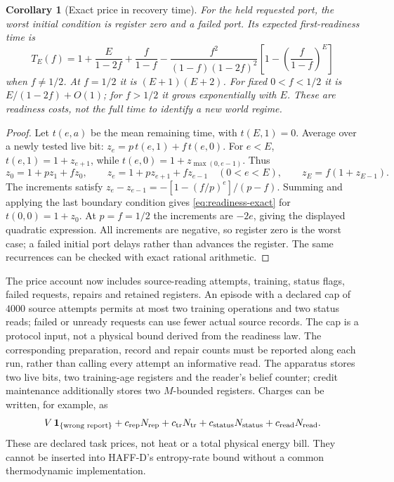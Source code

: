 \documentclass[11pt,a4paper]{article}
\newtheorem{corollary}[proposition]{Corollary}
\begin{document}
\begin{corollary}[Exact price in recovery time]\label{cor:readiness-exact}
For the held requested port, the worst initial condition is register
zero and a failed port. Its expected first-readiness time is
\begin{equation}\label{eq:readiness-exact}
 T_E(f)=1+\frac{E}{1-2f}+\frac{f}{1-f}
 -\frac{f^2}{(1-f)(1-2f)^2}
       \left[1-\left(\frac{f}{1-f}\right)^E\right]
\end{equation}
when $f\ne1/2$. At $f=1/2$ it is $(E+1)(E+2)$.
For fixed $0<f<1/2$ it is $E/(1-2f)+O(1)$; for $f>1/2$ it grows
exponentially with $E$. These are readiness costs, not the full time
to identify a new world regime.
\end{corollary}
\begin{proof}
Let $t(e,a)$ be the mean remaining time, with $t(E,1)=0$.
Average over a newly tested live bit: $z_e=p\,t(e,1)+f\,t(e,0)$.
For $e<E$, $t(e,1)=1+z_{e+1}$, while
$t(e,0)=1+z_{\max(0,e-1)}$. Thus
\[
 z_0=1+pz_1+fz_0,\qquad
 z_e=1+pz_{e+1}+fz_{e-1}\quad(0<e<E),\qquad
 z_E=f(1+z_{E-1}).
\]
The increments satisfy
$z_e-z_{e-1}=-[1-(f/p)^e]/(p-f)$.
Summing and applying the last boundary condition gives
\eqref{eq:readiness-exact} for $t(0,0)=1+z_0$.
At $p=f=1/2$ the increments are $-2e$, giving the displayed
quadratic expression. All increments are negative, so register zero
is the worst case; a failed initial port delays rather than advances
the register. The same recurrences can be checked with exact rational
arithmetic.
\end{proof}

The price account now includes source-reading attempts, training,
status flags, failed requests, repairs and retained registers. An
episode with a declared cap of $4000$ source attempts permits at
most two training operations and two status reads; failed or unready
requests can use fewer actual source records. The cap is a protocol
input, not a physical bound derived from the readiness law. The corresponding preparation, record
and repair counts must be reported along each run, rather than
calling every attempt an informative read. The apparatus stores two
live bits, two training-age registers and the reader's belief counter;
credit maintenance additionally stores two $M$-bounded registers.
Charges can be written, for example, as
\[
 V\,\mathbf1_{\{\text{wrong report}\}}+
 c_{\rm rep}N_{\rm rep}+c_{\rm tr}N_{\rm tr}
 +c_{\rm status}N_{\rm status}+c_{\rm read}N_{\rm read}.
\]
These are declared task prices, not heat or a total physical energy
bill. They cannot be inserted into HAFF-D's entropy-rate bound without
a common thermodynamic implementation.
\end{document}
